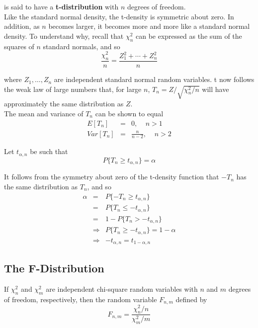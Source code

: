\documentclass[12pt]{article}
\begin{document}
is said to have a \textbf{t-distribution} with $n$ degrees of freedom. \\

Like the standard normal density, the t-density is symmetric about zero. In addition, as $n$ becomes larger, it becomes more and more like a standard normal density. To understand why, recall that $\chi_n^2$ can be expressed as the sum of the squares of $n$ standard normals, and so
\begin{equation*}
  \frac{\chi_n^2}{n} = \frac{Z_1^2 + \cdots + Z_n^2}{n}
\end{equation*}

where $Z_1, \dots, Z_n$ are independent standard normal random variables. t now follows the weak law of large numbers that, for large $n$, $T_n = Z / \sqrt{\chi_n^2 / n}$ will have approximately the same distribution as $Z$. \\

The mean and variance of $T_n$ can be shown to equal
\begin{eqnarray*}
  E[T_n] &=& 0, \;\;\;\; n > 1 \\
  Var[T_n] &=& \frac{n}{n-2}, \;\;\;\; n > 2
\end{eqnarray*}

Let $t_{\alpha, n}$ be such that
\begin{equation*}
  P\{ T_n \ge t_{\alpha, n} \} = \alpha
\end{equation*}

It follows from the symmetry about zero of the t-density function that $-T_n$ has the same distribution as $T_n$, and so
\begin{eqnarray*}
  \alpha
  &=& P \{ -T_n \ge t_{\alpha, n} \} \\
  &=& P \{ T_n \le -t_{\alpha, n} \} \\
  &=& 1 - P \{ T_n > -t_{\alpha, n} \} \\
  &\Rightarrow& P\{ T_n \ge -t_{\alpha, n} \} = 1 - \alpha \\
  &\Rightarrow& -t_{\alpha, n} = t_{1-\alpha, n}
\end{eqnarray*}

\subsection{The F-Distribution}

If $\chi_n^2$ and $\chi_m^2$ are independent chi-square random variables with $n$ and $m$ degrees of freedom, respectively, then the random variable $F_{n,m}$ defined by
\begin{equation*}
  F_{n,m} = \frac{\chi_n^2/n}{\chi_m^2/m}
\end{equation*}
\end{document}
